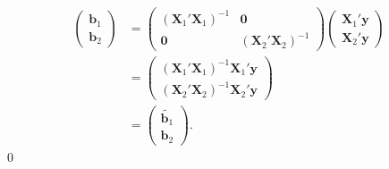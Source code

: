 \documentclass[a4paper,11pt]{article}
\begin{document}
\begin{align*}
    \begin{pmatrix}\bm{b}_1\\\bm{b}_2\end{pmatrix}&=\begin{pmatrix}(\bm{X}_1'\bm{X}_1)^{-1}&\bm{0}\\\bm{0}&(\bm{X}_2'\bm{X}_2)^{-1}\end{pmatrix}\begin{pmatrix}\bm{X}_1'\bm{y}\\\bm{X}_2'\bm{y}\end{pmatrix}\\
    &=\begin{pmatrix}(\bm{X}_1'\bm{X}_1)^{-1}\bm{X}_1'\bm{y}\\(\bm{X}_2'\bm{X}_2)^{-1}\bm{X}_2'\bm{y}\end{pmatrix}\\
    &=\begin{pmatrix}\widetilde{\bm{b}_1}\\\bm{b}_2\end{pmatrix}.
\end{align*}\qed
\end{document}
